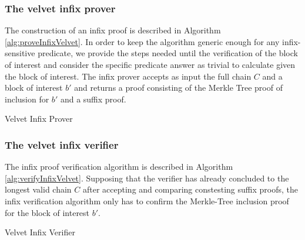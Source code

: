 \documentclass[10pt,a4paper]{article}
\begin{document}
\subsubsection*{The velvet infix prover}
The construction of an infix proof is described in Algorithm \ref{alg:proveInfixVelvet}. In order to keep the algorithm generic enough for any infix-sensitive predicate, we provide the steps needed until the verification of the block of interest and consider the specific predicate answer as trivial to calculate given the block of interest. The infix prover accepts as input the full chain $C$ and a block of interest $b'$ and returns a proof consisting of the Merkle Tree proof of inclusion for $b'$ and a suffix proof.
\vspace{4mm}

\begin{algorithm}[H]
\SetAlgoNoLine
\DontPrintSemicolon
{}
 \caption{Velvet Infix Prover}
 \label{alg:proveInfixVelvet}
\end{algorithm}

\vspace{4mm}

\subsubsection*{The velvet infix verifier}
The infix proof verification algorithm is described in Algorithm \ref{alg:verifyInfixVelvet}.
Supposing that the verifier has already concluded to the longest valid chain $C$ after accepting and comparing constesting suffix proofs, the infix verification algorithm only has to confirm the Merkle-Tree inclusion proof for the block of interest $b'$.

\vspace{4mm}

\begin{algorithm}[H]
\SetAlgoNoLine
\DontPrintSemicolon
{}
 \caption{Velvet Infix Verifier}
 \label{alg:verifyInfixVelvet}
\end{algorithm}

\vspace{4mm}

\end{document}
